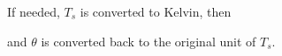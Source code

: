 If needed, $T_s$ is converted to Kelvin, then

and $ \theta $ is converted back to the original unit of $T_s$.
